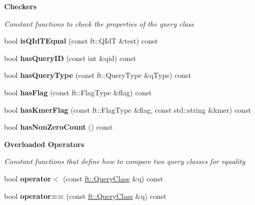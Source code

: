 \begin{Indent}\textbf{ Checkers}\par
{\em Constant functions to check the properties of the query class }\begin{DoxyCompactItemize}
\item 
\mbox{\label{classft_1_1QueryClass_a1ad56026188dfc5f3f5b98ea4987ef67}} 
bool {\bfseries is\+Q\+Id\+T\+Equal} (const ft\+::\+Q\+IdT \&test) const
\item 
\mbox{\label{classft_1_1QueryClass_a87a0c8acc939a89dc7bcd41b55b301a7}} 
bool {\bfseries has\+Query\+ID} (const int \&qid) const
\item 
\mbox{\label{classft_1_1QueryClass_ad0ec9e7dd966e6c87f8938b0788f138d}} 
bool {\bfseries has\+Query\+Type} (const ft\+::\+Query\+Type \&q\+Type) const
\item 
\mbox{\label{classft_1_1QueryClass_af2ec1d0d60024a99045d3b7ec3461431}} 
bool {\bfseries has\+Flag} (const ft\+::\+Flag\+Type \&flag) const
\item 
\mbox{\label{classft_1_1QueryClass_ae67d5016fbc2890b84386887baeaf0c5}} 
bool {\bfseries has\+Kmer\+Flag} (const ft\+::\+Flag\+Type \&flag, const std\+::string \&kmer) const
\item 
\mbox{\label{classft_1_1QueryClass_acff58f8c543a1b0c6bee421f704ebb0a}} 
bool {\bfseries has\+Non\+Zero\+Count} () const
\end{DoxyCompactItemize}
\end{Indent}
\begin{Indent}\textbf{ Overloaded Operators}\par
{\em Constant functions that define how to compare two query classes for equality }\begin{DoxyCompactItemize}
\item 
\mbox{\label{classft_1_1QueryClass_a4fc2a6ea3bd6c15fa94d90b1b23a111c}} 
bool {\bfseries operator$<$} (const \hyperlink{classft_1_1QueryClass}{ft\+::\+Query\+Class} \&q) const
\item 
\mbox{\label{classft_1_1QueryClass_af0b9bb01cfa9aa8e4e178b4757c5c369}} 
bool {\bfseries operator==} (const \hyperlink{classft_1_1QueryClass}{ft\+::\+Query\+Class} \&q) const
\end{DoxyCompactItemize}
\end{Indent}
